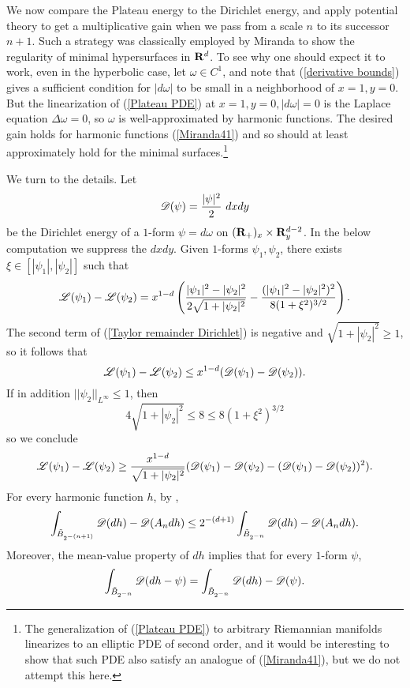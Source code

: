 We now compare the Plateau energy to the Dirichlet energy, and apply potential theory to get a multiplicative gain when we pass from a scale $n$ to its successor $n + 1$.
Such a strategy was classically employed by Miranda \cite[Teorema 4.3]{Miranda66} to show the regularity of minimal hypersurfaces in $\mathbf{R}^d$.
To see why one should expect it to work, even in the hyperbolic case, let $\omega \in C^1$, and note that (\ref{derivative bounds}) gives a sufficient condition for $|d\omega|$ to be small in a neighborhood of $x = 1, y = 0$.
But the linearization of (\ref{Plateau PDE}) at $x = 1, y = 0, |d\omega| = 0$ is the Laplace equation $\Delta \omega = 0$, so $\omega$ is well-approximated by harmonic functions.
The desired gain holds for harmonic functions (\ref{Miranda41}) and so should at least approximately hold for the minimal surfaces.\footnote{The generalization of (\ref{Plateau PDE}) to arbitrary Riemannian manifolds linearizes to an elliptic PDE of second order, and it would be interesting to show that such PDE also satisfy an analogue of (\ref{Miranda41}), but we do not attempt this here.}

We turn to the details.
Let
$$\mathscr D(\psi) = \frac{|\psi|^2}{2} ~dxdy$$
be the Dirichlet energy of a $1$-form $\psi = d\omega$ on $(\mathbf{R}_+)_x \times \mathbf{R}^{d - 2}_y$.
In the below computation we suppress the $dxdy$.
Given $1$-forms $\psi_1, \psi_2$, there exists $\xi \in [|\psi_1|, |\psi_2|]$ such that
\begin{equation}\label{Taylor remainder Dirichlet}
\mathscr L(\psi_1) - \mathscr L(\psi_2) = x^{1 - d}\left(\frac{|\psi_1|^2 - |\psi_2|^2}{2\sqrt{1 + |\psi_2|^2}} - \frac{(|\psi_1|^2 - |\psi_2|^2)^2}{8(1 + \xi^2)^{3/2}}\right).
\end{equation}
The second term of (\ref{Taylor remainder Dirichlet}) is negative and $\sqrt{1 + |\psi_2|^2} \geq 1$, so it follows that
\begin{equation}\label{Taylor lower bound}
\mathscr L(\psi_1) - \mathscr L(\psi_2) \leq x^{1 - d} (\mathscr D(\psi_1) - \mathscr D(\psi_2)).
\end{equation}
If in addition $||\psi_2||_{L^\infty} \leq 1$, then
$$4\sqrt{1 + |\psi_2|^2} \leq 8 \leq 8(1 + \xi^2)^{3/2}$$
so we conclude
\begin{equation}\label{Taylor upper bound}
\mathscr L(\psi_1) - \mathscr L(\psi_2) \geq \frac{x^{1 - d}}{\sqrt{1 + |\psi_2|^2}} (\mathscr D(\psi_1) - \mathscr D(\psi_2) - (\mathscr D(\psi_1) - \mathscr D(\psi_2))^2).
\end{equation}
For every harmonic function $h$, by \cite[Lemma 4.1]{Miranda66},
\begin{equation}\label{Miranda41}
\int_{\tilde B_{2^{-(n+1)}}} \mathscr D(dh) - \mathscr D(A_n dh) \leq 2^{-(d + 1)} \int_{\tilde B_{2^{-n}}} \mathscr D(dh) - \mathscr D(A_n dh).
\end{equation}
Moreover, the mean-value property of $dh$ implies that for every $1$-form $\psi$,
\begin{equation}\label{MVP derivative}
\int_{\tilde B_{2^{-n}}} \mathscr D(dh - \psi) = \int_{\tilde B_{2^{-n}}} \mathscr D(dh) - \mathscr D(\psi).
\end{equation}

